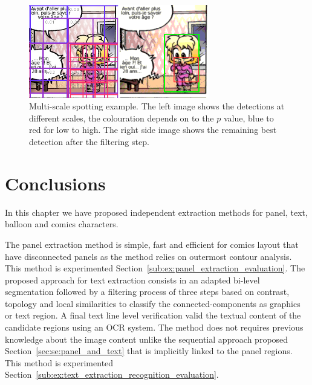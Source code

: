  \begin{figure}[!ht]  %
   \centering
  \includegraphics[trim= 0px 1px 0mm 0mm, clip,width=0.7\textwidth]{filtering.png}
  \caption[Multi-scale comic character spotting]{Multi-scale spotting example. The left image shows the detections at different scales, the colouration depends on to the $p$ value, blue to red for low to high. The right side image shows the remaining best detection after the filtering step. }
  \label{fig:in:filtering}
 \end{figure}



\section{Conclusions}
\label{sec:in:conclusion}

In this chapter we have proposed independent extraction methods for panel, text, balloon and comics characters.

The panel extraction method is simple, fast and efficient for comics layout that have disconnected panels as the method relies on outermost contour analysis.
This method is experimented Section~\ref{sub:ex:panel_extraction_evaluation}.
The proposed approach for text extraction consists in an adapted bi-level segmentation followed by a filtering process of three steps based on contrast, topology and local similarities to classify the connected-components as graphics or text region.
A final text line level verification valid the textual content of the candidate regions using an OCR system.
The method does not requires previous knowledge about the image content unlike the sequential approach proposed Section~\ref{sec:se:panel_and_text} that is implicitly linked to the panel regions.
This method is experimented Section~\ref{sub:ex:text_extraction_recognition_evaluation}.

